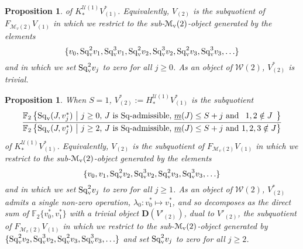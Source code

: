 \documentclass[11pt]{amsart}
\theoremstyle{plain}
\newtheorem{prop}[thm]{Proposition}
\theoremstyle{definition}
\newcommand{\calU}{\mathcal{U}}
\newcommand{\calM}{\mathcal{M}}
\newcommand{\calw}{\mathcal{W}}
\newcommand{\calMv}{\mathcal{M}_\textup{v}}
\theoremstyle{plain}
\newcommand{\minDimSq}{\underline{m}}
\newcommand{\Sq}{\mathrm{Sq}}
\newcommand{\Sqv}{\mathrm{Sq}_\textup{v}}
\newcommand{\F}{\mathbb{F}}
\newcommand{\Ftwo}{\F_2}
\newcommand{\dual}{\mathbf{D}}
\begin{document}
\begin{Calculations of HWn for n nonzero}
\begin{prop}
 of $K_*^{\calU(1)}V^*_{(1)}$. Equivalently, $V_{(2)}$ is the subquotient of $F_{\calM_v(2)}V_{(1)}$ in which we restrict to the sub-$\calMv(2)$-object generated by the elements%
\[\{v_0,\Sqv^2v_{1},\Sqv^3v_{1},\Sqv^2v_{2},\Sqv^3v_{2},\Sqv^2v_{3},\Sqv^3v_{3},\ldots\}\]
and in which we set $\Sqv^2 v_{j}$ to zero for all $j\geq0$.   As an object of $\calw(2)$, $V^*_{(2)}$ is trivial.
\end{prop}
\begin{prop}\label{Se1 calc of V2}
When $S=1$, $V^*_{(2)}:=H_*^{\calU(1)}V^*_{(1)}$ is the subquotient
\[\frac{{\F_{2}\left\{\Sq_{\textup{v}}(J,v_j^*)\ \middle|\ \makebox[\widthof{$\textup{$j\geq2$}$}][c]{$\textup{$j\geq0$}$}\textup{, $J$ is $\Sq$-admissible, $\minDimSq(J)\leq S+j$ and}\makebox[\widthof{$\textup{ $1,2,3\notin J$}$}][c]{$\textup{ $1,2\notin J$}$}\right\}}}{{\F_{2}\left\{\Sq_{\textup{v}}(J,v_j^*)\ \middle|\ \makebox[\widthof{$\textup{$j\geq2$}$}][c]{$\textup{$j\geq2$}$}\textup{, $J$ is $\Sq$-admissible, $\minDimSq(J)\leq S+j$ and}\makebox[\widthof{$\textup{ $1,2,3\notin J$}$}][c]{$\textup{ $1,2,3\notin J$}$}\right\}}}\]
 of $K_*^{\calU(1)}V^*_{(1)}$. Equivalently, $V_{(2)}$ is the subquotient of $F_{\calM_v(2)}V_{(1)}$ in which we restrict to the sub-$\calMv(2)$-object generated by the elements%
\[\{v_0,v_1,\Sqv^2v_{2},\Sqv^3v_{2},\Sqv^2v_{3},\Sqv^3v_{3},\ldots\}\]
and in which we set $\Sqv^2 v_{j}$ to zero for all $j\geq1$.  As an object of $\calw(2)$, $V^*_{(2)}$ admits a single non-zero operation, $\lambda_0:v_0^*\longmapsto v_1^*$, and so decomposes as the direct sum of
$\Ftwo \{v_0^*,v_1^*\}$ with a trivial object $\dual(V'_{(2)})$, dual to $V'_{(2)}$, the subquotient of $F_{\calM_v(2)}V_{(1)}$ in which we restrict to the sub-$\calMv(2)$-object generated by
$\{\Sqv^2v_{2},\Sqv^3v_{2},\Sqv^2v_{3},\Sqv^3v_{3},\ldots\}$ and set $\Sqv^2 v_{j}$ to zero for all $j\geq2$.
\end{prop}
%

\end{Calculations of HWn for n nonzero}
\end{document}
